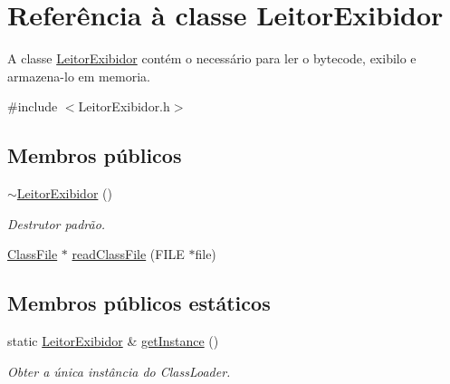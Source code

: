 \hypertarget{classLeitorExibidor}{}\section{Referência à classe Leitor\+Exibidor}
\label{classLeitorExibidor}


A classe \hyperlink{classLeitorExibidor}{Leitor\+Exibidor} contém o necessário para ler o bytecode, exibilo e armazena-\/lo em memoria.  




{\ttfamily \#include $<$Leitor\+Exibidor.\+h$>$}

\subsection*{Membros públicos}
\begin{DoxyCompactItemize}
\item 
\hyperlink{classLeitorExibidor_a7785a12083b7979aa615915cb8e2d274}{$\sim$\+Leitor\+Exibidor} ()
\begin{DoxyCompactList}\small\item\em Destrutor padrão. \end{DoxyCompactList}\item 
\hyperlink{classClassFile}{Class\+File} $\ast$ \hyperlink{classLeitorExibidor_af6f4f84cbfaf72e6673e1dc42023b308}{read\+Class\+File} (F\+I\+LE $\ast$file)
\end{DoxyCompactItemize}
\subsection*{Membros públicos estáticos}
\begin{DoxyCompactItemize}
\item 
static \hyperlink{classLeitorExibidor}{Leitor\+Exibidor} \& \hyperlink{classLeitorExibidor_ab6f5cece56cf5d2e486a5512d52de392}{get\+Instance} ()
\begin{DoxyCompactList}\small\item\em Obter a única instância do Class\+Loader. \end{DoxyCompactList}\end{DoxyCompactItemize}
